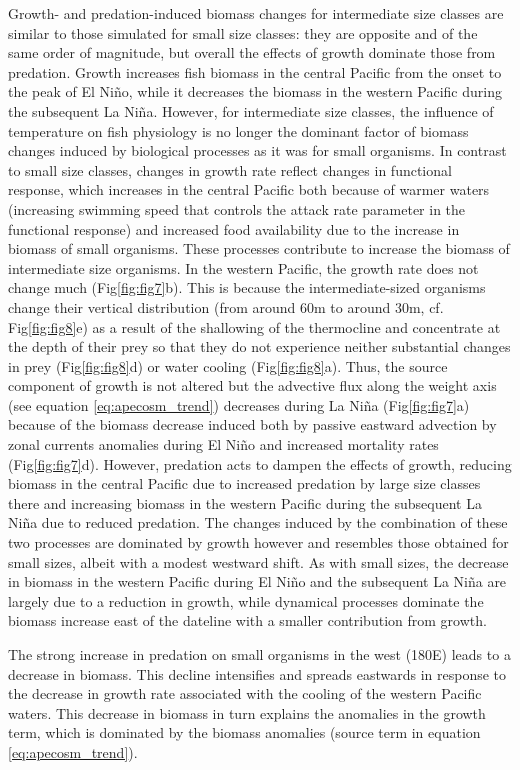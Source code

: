 Growth- and predation-induced biomass changes for intermediate size classes are similar to those simulated for small size classes: they are opposite and of the same order of magnitude, but overall the effects of growth dominate those from predation. Growth increases fish biomass in the central Pacific from the onset to the peak of El Niño, while it decreases the biomass in the western Pacific during the subsequent La Niña. However, for intermediate size classes, the influence of temperature on fish physiology is no longer the dominant factor of biomass changes induced by biological processes as it was for small organisms. In contrast to small size classes, changes in growth rate reflect changes in functional response, which increases in the central Pacific both because of warmer waters (increasing swimming speed that controls the attack rate parameter in the functional response) and increased food availability due to the increase in biomass of small organisms. These processes contribute to increase the biomass of intermediate size organisms. In the western Pacific, the growth rate does not change much (Fig\ref{fig:fig7}b). This is because the intermediate-sized organisms change their vertical distribution (from around 60m to around 30m, cf. Fig\ref{fig:fig8}e) as a result of the shallowing of the thermocline and concentrate at the depth of their prey so that they do not experience neither substantial changes in prey  (Fig\ref{fig:fig8}d) or water cooling (Fig\ref{fig:fig8}a). Thus, the source component of growth is not altered but the advective flux along the weight axis (see equation \ref{eq:apecosm_trend}) decreases during La Niña (Fig\ref{fig:fig7}a) because of the biomass decrease induced both by passive eastward advection by zonal currents anomalies during El Niño and increased mortality rates (Fig\ref{fig:fig7}d). However, predation acts to dampen the effects of growth, reducing biomass in the central Pacific due to increased predation by large size classes there and increasing biomass in the western Pacific during the subsequent La Niña due to reduced predation. The changes induced by the combination of these two processes are dominated by growth however and resembles those obtained for small sizes, albeit with a modest westward shift. As with small sizes, the decrease in biomass in the western Pacific during El Niño and the subsequent La Niña are largely due to a reduction in growth, while dynamical processes dominate the biomass increase east of the dateline with a smaller contribution from growth.

The strong increase in predation on small organisms in the west (180E) leads to a decrease in biomass. This decline intensifies and spreads eastwards in response to the decrease in growth rate associated with the cooling of the western Pacific waters. This decrease in biomass in turn explains the anomalies in the growth term, which is dominated by the biomass anomalies (source term in equation \ref{eq:apecosm_trend}).


